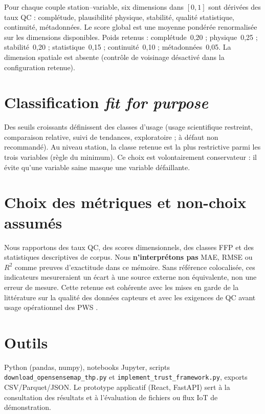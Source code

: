 \documentclass[12pt,a4paper]{report}
\begin{document}
Pour chaque couple station--variable, six dimensions dans $[0,1]$ sont dérivées
des taux QC : complétude, plausibilité physique, stabilité, qualité
statistique, continuité, métadonnées. Le score global est une moyenne pondérée
renormalisée sur les dimensions disponibles. Poids retenus : complétude~0,20 ;
physique~0,25 ; stabilité~0,20 ; statistique~0,15 ; continuité~0,10 ;
métadonnées~0,05. La dimension spatiale est absente (contrôle de voisinage
désactivé dans la configuration retenue).

\section{Classification \textit{fit for purpose}}

Des seuils croissants définissent des classes d'usage (usage scientifique
restreint, comparaison relative, suivi de tendances, exploratoire ; à défaut
non recommandé). Au niveau station, la classe retenue est la plus restrictive
parmi les trois variables (règle du minimum). Ce choix est volontairement
conservateur : il évite qu'une variable saine masque une variable défaillante.

\section{Choix des métriques et non-choix assumés}

Nous rapportons des taux QC, des scores dimensionnels, des classes FFP et des
statistiques descriptives de corpus. Nous \textbf{n'interprétons pas} MAE, RMSE
ou $R^2$ comme preuves d'exactitude dans ce mémoire. Sans référence
colocalisée, ces indicateurs mesureraient un écart à une source externe non
équivalente, non une erreur de mesure. Cette retenue est cohérente avec les
mises en garde de la littérature sur la qualité des données capteurs
\cite{teh2020sensor} et avec les exigences de QC avant usage opérationnel des
PWS \cite{devos2019qc}.

\section{Outils}

Python (pandas, numpy), notebooks Jupyter, scripts
\texttt{download\_opensensemap\_thp.py} et
\texttt{implement\_trust\_framework.py}, exports CSV/Parquet/JSON. Le prototype
applicatif (React, FastAPI) sert à la consultation des résultats et à
l'évaluation de fichiers ou flux IoT de démonstration.
\end{document}
